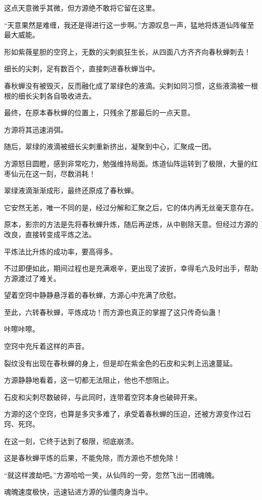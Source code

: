 \begin{this_body}
这点天意微乎其微，但方源绝不敢将它留在这里。

“天意果然是难缠，我还是得进行这一步啊。”方源叹息一声，猛地将炼道仙阵催至最大威能。

形如紫薇星胆的空窍上，无数的尖刺疯狂生长，从四面八方齐齐向春秋蝉刺去！

细长的尖刺，足有数百个，直接刺进春秋蝉当中。

春秋蝉没有被毁灭，反而融化成了翠绿色的液滴。尖刺如同习惯，这些液滴被一根根的细长尖刺各自吸收进去。

最终，在原本春秋蝉的位置上，只残余了那最后的一点天意。

方源将其迅速消弭。

随后，翠绿的液滴被细长尖刺重新挤出，凝聚到中心，汇聚成一团。

方源怒目圆瞪，感到非常吃力，勉强维持局面。炼道仙阵运转到了极限，大量的红枣仙元在这一刻，尽数消耗！

翠绿液滴渐渐成形，最终还原成了春秋蝉。

它安然无恙，唯一不同的是，经过分解和汇聚之后，它的体内再无丝毫天意存在。

原本，影宗的方法是先将春秋蝉升炼，随后再逆炼，从中剔除天意。但经过方源的改良，直接转变成平炼之法。

平炼法比升炼的成功率，要高得多。

不过即便如此，期间过程也是充满艰辛，更出现了波折，幸得毛六及时出手，帮助方源渡过了难关。

望着空窍中静静悬浮着的春秋蝉，方源心中充满了欣慰。

至此，六转春秋蝉，平炼成功！而方源也真正的掌握了这只传奇仙蛊！

咔嚓咔嚓。

空窍中充斥着这样的声音。

裂纹没有出现在春秋蝉的身上，但是却在紫金色的石皮和尖刺上迅速蔓延。

方源静静地看着，这一切都无法阻止，他也不想阻止。

石皮和尖刺尽数破碎，与此同时，连带着空窍本身也破碎开来。

方源的这个空窍，也算是多灾多难了，承受着春秋蝉的压迫，还被方源变作过石窍、死窍。

在这一刻，它终于达到了极限，彻底崩溃。

这是春秋蝉平炼的后果，不能免除，而方源也不想免除！

“就这样渡劫吧。”方源哈哈一笑，从仙阵的一旁，忽然飞出一团魂魄。

魂魄速度极快，迅速钻进方源的仙僵肉身当中。


\end{this_body}
